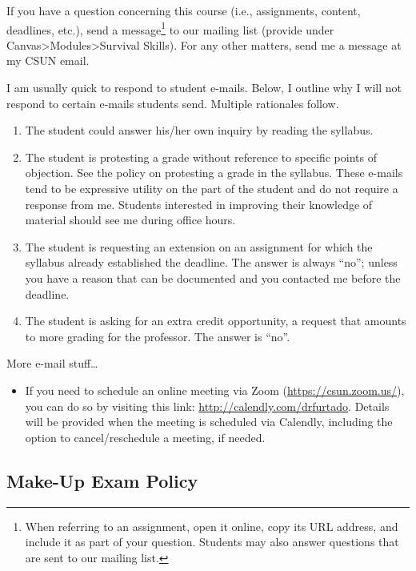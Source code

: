 \documentclass[11pt,]{article}
\providecommand{\tightlist}{%
  \setlength{\itemsep}{0pt}\setlength{\parskip}{0pt}}
\begin{document}
If you have a question concerning this course (i.e., assignments,
content, deadlines, etc.), send a message\footnote{When referring to an
  assignment, open it online, copy its URL address, and include it as
  part of your question. Students may also answer questions that are
  sent to our mailing list.} to our mailing list (provide under
Canvas\textgreater Modules\textgreater Survival Skills). For any other
matters, send me a message at my CSUN email.

I am usually quick to respond to student e-mails. Below, I outline why I
will not respond to certain e-mails students send. Multiple rationales
follow.

\begin{enumerate}
\def\labelenumi{\arabic{enumi}.}
\tightlist
\item
  The student could answer his/her own inquiry by reading the syllabus.
\item
  The student is protesting a grade without reference to specific points
  of objection. See the policy on protesting a grade in the syllabus.
  These e-mails tend to be expressive utility on the part of the student
  and do not require a response from me. Students interested in
  improving their knowledge of material should see me during office
  hours.
\item
  The student is requesting an extension on an assignment for which the
  syllabus already established the deadline. The answer is always
  ``no''; unless you have a reason that can be documented and you
  contacted me before the deadline.
\item
  The student is asking for an extra credit opportunity, a request that
  amounts to more grading for the professor. The answer is ``no''.
\end{enumerate}

More e-mail stuff\ldots{}

\begin{itemize}
\tightlist
\item
  If you need to schedule an online meeting via Zoom
  (\url{https://csun.zoom.us/}), you can do so by visiting this link:
  \url{http://calendly.com/drfurtado}. Details will be provided when the
  meeting is scheduled via Calendly, including the option to
  cancel/reschedule a meeting, if needed.
\end{itemize}

\hypertarget{make-up-exam-policy}{%
\subsection{Make-Up Exam Policy}\label{make-up-exam-policy}}
\end{document}
